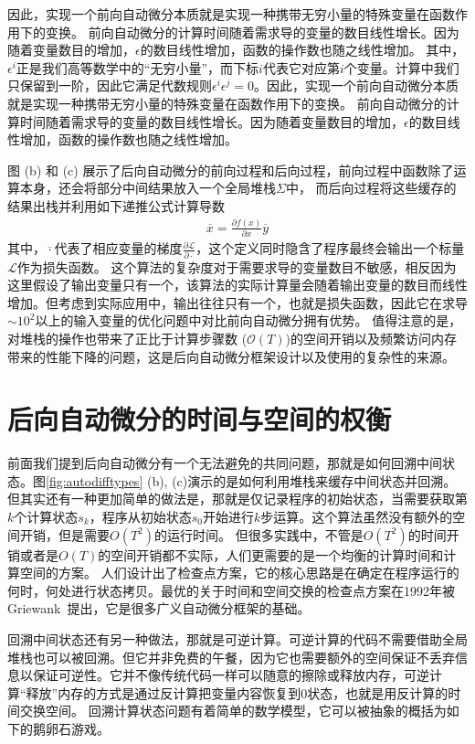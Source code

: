 \documentclass[A4,twoside,fontset=ubuntu,UTF8]{ctexart}
\begin{document}
因此，实现一个前向自动微分本质就是实现一种携带无穷小量的特殊变量在函数作用下的变换。
前向自动微分的计算时间随着需求导的变量的数目线性增长。因为随着变量数目的增加，$\epsilon$的数目线性增加，函数的操作数也随之线性增加。
其中，$\epsilon^i$正是我们高等数学中的“无穷小量”，而下标$i$代表它对应第$i$个变量。计算中我们只保留到一阶，因此它满足代数规则$\epsilon^i\epsilon^j = 0$。因此，实现一个前向自动微分本质就是实现一种携带无穷小量的特殊变量在函数作用下的变换。
前向自动微分的计算时间随着需求导的变量的数目线性增长。因为随着变量数目的增加，$\epsilon$的数目线性增加，函数的操作数也随之线性增加。

图 (b) 和 (c) 展示了后向自动微分的前向过程和后向过程，前向过程中函数除了运算本身，还会将部分中间结果放入一个全局堆栈$\Sigma$中，
而后向过程将这些缓存的结果出栈并利用如下递推公式计算导数
\begin{align}
    \overline{x} = \frac{\partial f(x)}{\partial x}\overline{y}
\end{align}
其中，$\overline{\cdot}$代表了相应变量的梯度$\frac{\partial \mathcal{L}}{\partial \cdot}$，这个定义同时隐含了程序最终会输出一个标量$\mathcal{L}$作为损失函数。
这个算法的复杂度对于需要求导的变量数目不敏感，相反因为这里假设了输出变量只有一个，该算法的实际计算量会随着输出变量的数目而线性增加。但考虑到实际应用中，输出往往只有一个，也就是损失函数，因此它在求导$\sim 10^2$以上的输入变量的优化问题中对比前向自动微分拥有优势。
值得注意的是，对堆栈的操作也带来了正比于计算步骤数 ($\mathcal{O}(T)$)的空间开销以及频繁访问内存带来的性能下降的问题，这是后向自动微分框架设计以及使用的复杂性的来源。

\section{后向自动微分的时间与空间的权衡}\label{sec:timespace}

前面我们提到后向自动微分有一个无法避免的共同问题，那就是如何回溯中间状态。图\ref{fig:autodifftypes} (b), (c)演示的是如何利用堆栈来缓存中间状态并回溯。但其实还有一种更加简单的做法是，那就是仅记录程序的初始状态，当需要获取第$k$个计算状态$s_k$，程序从初始状态$s_0$开始进行$k$步运算。这个算法虽然没有额外的空间开销，但是需要$O(T^2)$的运行时间。
但很多实践中，不管是$O(T^2)$的时间开销或者是$O(T)$的空间开销都不实际，人们更需要的是一个均衡的计算时间和计算空间的方案。
人们设计出了检查点方案，它的核心思路是在确定在程序运行的何时，何处进行状态拷贝。最优的关于时间和空间交换的检查点方案在1992年被Griewank~\cite{Griewank1992}提出，它是很多广义自动微分框架的基础。
 
回溯中间状态还有另一种做法，那就是可逆计算。可逆计算的代码不需要借助全局堆栈也可以被回溯。但它并非免费的午餐，因为它也需要额外的空间保证不丢弃信息以保证可逆性。它并不像传统代码一样可以随意的擦除或释放内存，可逆计算“释放”内存的方式是通过反计算把变量内容恢复到0状态，也就是用反计算的时间交换空间。
回溯计算状态问题有着简单的数学模型，它可以被抽象的概括为如下的鹅卵石游戏。
\end{document}
